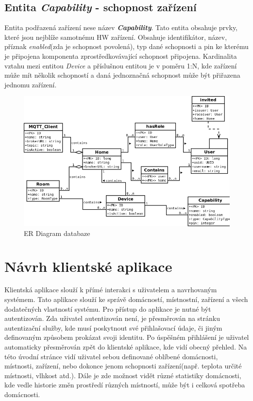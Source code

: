 \subsection*{Entita \emph{Capability} - schopnost zařízení}
\label{databaze:capability}
Entita podřazená zařízení nese název \textbf{\emph{Capability}}. Tato entita obsahuje prvky, které jsou nejblíže samotnému HW zařízení.
Obsahuje identifikátor, název, příznak \emph{enabled}(zda je schopnost povolená), typ dané schopnosti a pin ke kterému je připojena komponenta zprostředkovávající schopnost připojena.
Kardinalita vztahu mezi entitou \emph{Device} a příslušnou entitou je v poměru 1:N, kde zařízení může mít několik schopností a daná jednoznačná schopnost může být přiřazena jednomu zařízení.

\begin{figure}[hbt]
  \centering
  \includegraphics[width=0.9 \linewidth]{obrazky-figures/erdiagram.png}
  \caption{ER Diagram databaze}
  \label{figure:er_databaze}
\end{figure}

\newpage
\section{Návrh klientské aplikace}
\label{navrh:frontend}

Klientská aplikace slouží k přímé interakci s uživatelem a navrhovaným systémem.
Tato aplikace slouží ke správě domácností, místnostní, zařízení a všech dodatečných vlastností systému.
Pro přístup do aplikace je nutné být autentizován.
Zda uživatel autentizován není, je přesměrován na stránku autentizační služby, kde musí poskytnout své přihlašovací údaje, či jiným definovaným způsobem prokázat svoji identitu.
Po úspěšném přihlášení je uživatel automaticky přesměrován zpět do klientské aplikace, kde vidí obecný přehled.
Na této úvodní stránce vidí uživatel sebou definované oblíbené domácnosti, místnosti, zařízení, nebo dokonce jenom schopnosti zařízení(např. teplota určité místnosti, vlhkost atd.).
Dále je zde možnost vidět různé statistiky domácnosti, kde vedle historie změn prostředí různých místností, může být i celková spotřeba domácnosti.

